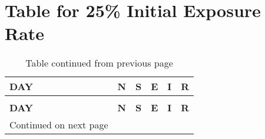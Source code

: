 \chapter{Table for 25\% Initial Exposure Rate}


\begin{longtable}{|l|l|l|l|l|l|}
	\caption{25\% Initial Exposure Rate} \\
	
	\toprule
	\textbf{DAY} & \textbf{N} & \textbf{S} & \textbf{E }& \textbf{I} &\textbf{ R} \\
	\midrule
	\endfirsthead
	\caption*{Table continued from previous page} \\
	\toprule
	\textbf{DAY} & \textbf{N} & \textbf{S} & \textbf{E }& \textbf{I} &\textbf{ R} \\
	\midrule
	\endhead
	\midrule
	\multicolumn{1}{r}{\footnotesize Continued on next page}
	\endfoot
	\bottomrule
	\endlastfoot
	

\end{longtable}
